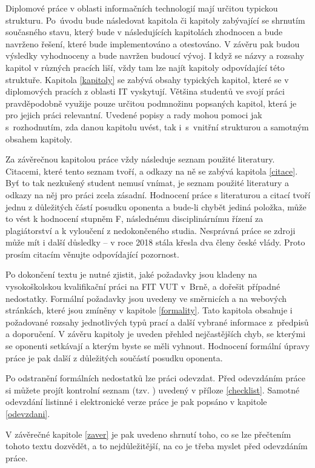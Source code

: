 Diplomové práce v oblasti informačních technologií mají určitou typickou strukturu. Po~úvodu bude následovat kapitola či kapitoly zabývající se shrnutím současného stavu, který bude v následujících kapitolách zhodnocen a bude navrženo řešení, které bude implementováno a otestováno. V závěru pak budou výsledky vyhodnoceny a bude navržen budoucí vývoj. I když se názvy a rozsahy kapitol v různých pracích liší, vždy tam lze najít kapitoly odpovídající této struktuře. Kapitola \ref{kapitoly} se zabývá obsahy typických kapitol, které se v diplomových pracích z oblasti IT vyskytují. Většina studentů ve svojí práci pravděpodobně využije pouze určitou podmnožinu popsaných kapitol, která je pro jejich práci relevantní. Uvedené popisy a rady mohou pomoci jak s~rozhodnutím, zda danou kapitolu uvést, tak i~s~vnitřní strukturou a samotným obsahem kapitoly.

Za závěrečnou kapitolou práce vždy následuje seznam použité literatury. Citacemi, které tento seznam tvoří, a odkazy na ně se zabývá kapitola \ref{citace}. Byť to tak nezkušený student nemusí vnímat, je seznam použité literatury a odkazy na něj pro práci zcela zásadní. Hodnocení práce s literaturou a citací tvoří jednu z důležitých částí posudku oponenta a bude-li chybět jediná položka, může to vést k hodnocení stupněm F, následnému disciplinárnímu řízení za plagiátorství a k vyloučení z nedokončeného studia. Nesprávná práce se zdroji může mít i další důsledky -- v roce 2018 stála křesla dva členy české vlády. Proto prosím citacím věnujte odpovídající pozornost. 

Po dokončení textu je nutné zjistit, jaké požadavky jsou kladeny na vysokoškolskou kvalifikační práci na FIT VUT v~Brně, a dořešit případné nedostatky. Formální požadavky jsou uvedeny ve směrnicích a na webových stránkách, které jsou zmíněny v kapitole \ref{formality}. Tato kapitola obsahuje i požadované rozsahy jednotlivých typů prací a další vybrané informace z~předpisů a doporučení. V závěru kapitoly je uveden přehled nejčastějších chyb, se kterými se oponenti setkávají a kterým byste se měli vyhnout. Hodnocení formální úpravy práce je pak další z důležitých součástí posudku oponenta.

Po odstranění formálních nedostatků lze práci odevzdat. Před odevzdáním práce si můžete projít kontrolní seznam (tzv. ) uvedený v příloze \ref{checklist}. Samotné odevzdání listinné i elektronické verze práce je pak popsáno v kapitole \ref{odevzdani}.

V závěrečné kapitole \ref{zaver} je pak uvedeno shrnutí toho, co se lze přečtením tohoto textu dozvědět, a to nejdůležitější, na co je třeba myslet před odevzdáním práce.


